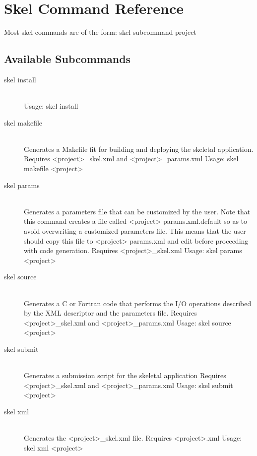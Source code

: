 \chapter{Skel Command Reference}

Most skel commands are of the form:
skel
subcommand project
\section{Available Subcommands}

\begin{description}
  \item[skel install] \hfill \\
Usage:
skel install
  \item[skel makefile] \hfill \\
Generates a Makefile fit for building and deploying the skeletal
application.
Requires <project>\_skel.xml and <project>\_params.xml
Usage:
skel makefile <project>
  \item[skel params] \hfill \\
Generates a parameters file that can be customized by the user.
Note that this command creates a file called <project> params.xml.default
so as to avoid overwriting a customized parameters file. This means that
the user should copy this file to <project> params.xml and edit before
proceeding with code generation.
Requires <project>\_skel.xml
Usage:
skel params <project>
  \item[skel source] \hfill \\
Generates a C or Fortran code that performs the I/O operations
described by the XML descriptor and the parameters file.
Requires <project>\_skel.xml and <project>\_params.xml
Usage:
skel source <project>
  \item[skel submit] \hfill \\
Generates a submission script for the skeletal application
Requires <project>\_skel.xml and <project>\_params.xml
Usage:
skel submit <project>
  \item[skel xml] \hfill \\
Generates the <project>\_skel.xml file.
Requires <project>.xml
Usage:
skel xml <project>
\end{description}
